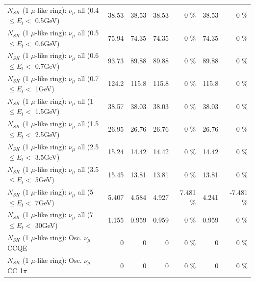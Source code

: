 \begin{table}
\begin{tabular}{| l | r | r | r  r | r  r |}
       $N_{SK}$ (1 $\mu$-like ring): $\nu_{\mu}$ all (0.4 $\leq E_{t} <$ 0.5GeV) &           38.53 &           38.53 &           38.53 &        0 \%  &           38.53 &        0 \%  \\ 
       $N_{SK}$ (1 $\mu$-like ring): $\nu_{\mu}$ all (0.5 $\leq E_{t} <$ 0.6GeV) &           75.94 &           74.35 &           74.35 &        0 \%  &           74.35 &        0 \%  \\ 
       $N_{SK}$ (1 $\mu$-like ring): $\nu_{\mu}$ all (0.6 $\leq E_{t} <$ 0.7GeV) &           93.73 &           89.88 &           89.88 &        0 \%  &           89.88 &        0 \%  \\ 
         $N_{SK}$ (1 $\mu$-like ring): $\nu_{\mu}$ all (0.7 $\leq E_{t} <$ 1GeV) &           124.2 &           115.8 &           115.8 &        0 \%  &           115.8 &        0 \%  \\ 
         $N_{SK}$ (1 $\mu$-like ring): $\nu_{\mu}$ all (1 $\leq E_{t} <$ 1.5GeV) &           38.57 &           38.03 &           38.03 &        0 \%  &           38.03 &        0 \%  \\ 
       $N_{SK}$ (1 $\mu$-like ring): $\nu_{\mu}$ all (1.5 $\leq E_{t} <$ 2.5GeV) &           26.95 &           26.76 &           26.76 &        0 \%  &           26.76 &        0 \%  \\ 
       $N_{SK}$ (1 $\mu$-like ring): $\nu_{\mu}$ all (2.5 $\leq E_{t} <$ 3.5GeV) &           15.24 &           14.42 &           14.42 &        0 \%  &           14.42 &        0 \%  \\ 
         $N_{SK}$ (1 $\mu$-like ring): $\nu_{\mu}$ all (3.5 $\leq E_{t} <$ 5GeV) &           15.45 &           13.81 &           13.81 &        0 \%  &           13.81 &        0 \%  \\ 
           $N_{SK}$ (1 $\mu$-like ring): $\nu_{\mu}$ all (5 $\leq E_{t} <$ 7GeV) &           5.407 &           4.584 &           4.927 &    7.481 \%  &           4.241 &   -7.481 \%  \\ 
          $N_{SK}$ (1 $\mu$-like ring): $\nu_{\mu}$ all (7 $\leq E_{t} <$ 30GeV) &           1.155 &           0.959 &           0.959 &        0 \%  &           0.959 &        0 \%  \\ 
\hline
\hline
                               $N_{SK}$ (1 $\mu$-like ring): Osc. $\nu_\mu$ CCQE &               0 &               0 &               0 &        0 \%  &               0 &        0 \%  \\ 
                          $N_{SK}$ (1 $\mu$-like ring): Osc. $\nu_\mu$ CC 1$\pi$ &               0 &               0 &               0 &        0 \%  &               0 &        0 \%  \\ 

\end{tabular}
\end{table}
